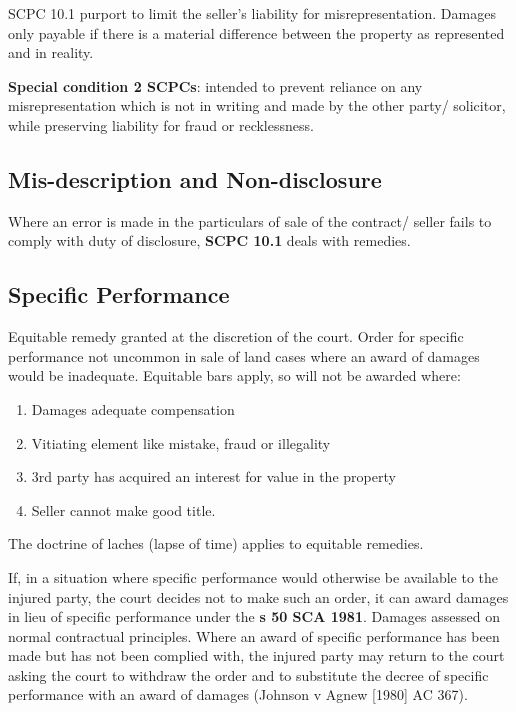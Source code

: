 \documentclass[
]{article}
\providecommand{\tightlist}{%
  \setlength{\itemsep}{0pt}\setlength{\parskip}{0pt}}
\begin{document}
SCPC 10.1 purport to limit the seller's liability for misrepresentation.
Damages only payable if there is a material difference between the
property as represented and in reality.

\textbf{Special condition 2 SCPCs}: intended to prevent reliance on any
misrepresentation which is not in writing and made by the other party/
solicitor, while preserving liability for fraud or recklessness.

\hypertarget{mis-description-and-non-disclosure}{%
\subsection{Mis-description and
Non-disclosure}\label{mis-description-and-non-disclosure}}

Where an error is made in the particulars of sale of the contract/
seller fails to comply with duty of disclosure, \textbf{SCPC 10.1} deals
with remedies.

\hypertarget{specific-performance}{%
\subsection{Specific Performance}\label{specific-performance}}

Equitable remedy granted at the discretion of the court. Order for
specific performance not uncommon in sale of land cases where an award
of damages would be inadequate. Equitable bars apply, so will not be
awarded where:

\begin{enumerate}
\tightlist
\item
  Damages adequate compensation
\item
  Vitiating element like mistake, fraud or illegality
\item
  3rd party has acquired an interest for value in the property
\item
  Seller cannot make good title.
\end{enumerate}

The doctrine of laches (lapse of time) applies to equitable remedies.

If, in a situation where specific performance would otherwise be
available to the injured party, the court decides not to make such an
order, it can award damages in lieu of specific performance under the
\textbf{s 50 SCA 1981}. Damages assessed on normal contractual
principles. Where an award of specific performance has been made but has
not been complied with, the injured party may return to the court asking
the court to withdraw the order and to substitute the decree of specific
performance with an award of damages (Johnson v Agnew {[}1980{]} AC
367).
\end{document}
